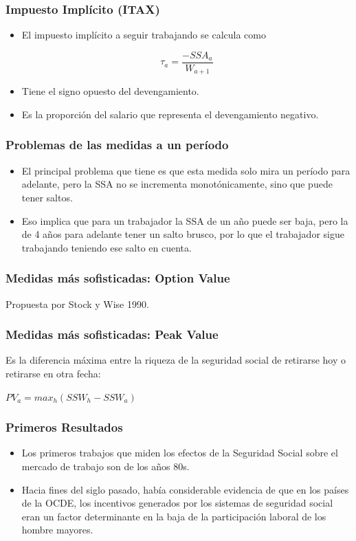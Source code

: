 \documentclass{beamer}
\begin{document}
\frame
{
  \frametitle{Impuesto Implícito (ITAX)}
  
  
    \begin{itemize}
    \item El impuesto implícito a seguir trabajando se calcula como 

      \[ \tau_{a} = \frac{-SSA_{a}}{W_{a+1}}\]

    \item Tiene el signo opuesto del devengamiento.
    \item Es la proporción del salario que representa el devengamiento negativo.

    \end{itemize}
}
\frame
{
  \frametitle{Problemas de las medidas a un período}
  \begin{itemize}
      \item El principal problema que tiene es que esta medida solo mira un período para adelante, pero la SSA no se incrementa monotónicamente, sino que puede tener saltos. 

    \item Eso implica que para un trabajador la SSA de un año puede ser baja, pero la de 4 años para adelante tener un salto brusco, por lo que el trabajador sigue trabajando teniendo ese salto en cuenta.
  \end{itemize}
}
\frame
{
  \frametitle{Medidas más sofisticadas: Option Value}
   
   Propuesta por Stock y Wise 1990.
}

\frame
{
  \frametitle{Medidas más sofisticadas: Peak Value}
    Es la diferencia máxima entre la riqueza de la seguridad social de retirarse hoy o retirarse en otra fecha:
    
        $PV_{a} = max_{h}(SSW_{h}-SSW_{a})$

}
\frame
{
  \frametitle{Primeros Resultados}
  \begin{itemize}
  \item Los primeros trabajos que miden los efectos de la Seguridad Social sobre el mercado de trabajo son de los años 80s.
  \item Hacia fines del siglo pasado, había considerable evidencia de que en los países de la OCDE, los incentivos generados por los sistemas de seguridad social eran un factor determinante en la baja de la participación laboral de los hombre mayores.
  \end{itemize}
}
\end{document}
